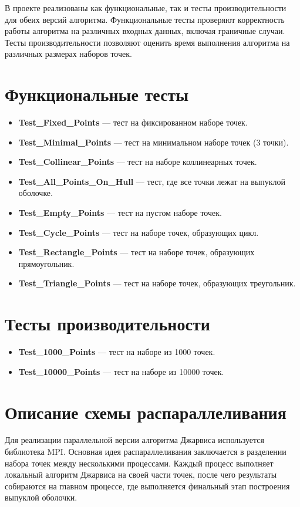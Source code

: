 \documentclass[12pt]{article}
\begin{document}
В проекте реализованы как функциональные, так и тесты производительности для обеих версий алгоритма. Функциональные тесты проверяют корректность работы алгоритма на различных входных данных, включая граничные случаи. Тесты производительности позволяют оценить время выполнения алгоритма на различных размерах наборов точек.

\section*{Функциональные тесты}

\begin{itemize}
\item \textbf{Test_Fixed_Points} — тест на фиксированном наборе точек.
\item \textbf{Test_Minimal_Points} — тест на минимальном наборе точек (3 точки).
\item \textbf{Test_Collinear_Points} — тест на наборе коллинеарных точек.
\item \textbf{Test_All_Points_On_Hull} — тест, где все точки лежат на выпуклой оболочке.
\item \textbf{Test_Empty_Points} — тест на пустом наборе точек.
\item \textbf{Test_Cycle_Points} — тест на наборе точек, образующих цикл.
\item \textbf{Test_Rectangle_Points} — тест на наборе точек, образующих прямоугольник.
\item \textbf{Test_Triangle_Points} — тест на наборе точек, образующих треугольник.
\end{itemize}

\section*{Тесты производительности}

\begin{itemize}
\item \textbf{Test_1000_Points} — тест на наборе из 1000 точек.
\item \textbf{Test_10000_Points} — тест на наборе из 10000 точек.
\end{itemize}

\section*{Описание схемы распараллеливания}

Для реализации параллельной версии алгоритма Джарвиса используется библиотека MPI. Основная идея распараллеливания заключается в разделении набора точек между несколькими процессами. Каждый процесс выполняет локальный алгоритм Джарвиса на своей части точек, после чего результаты собираются на главном процессе, где выполняется финальный этап построения выпуклой оболочки.
\end{document}
